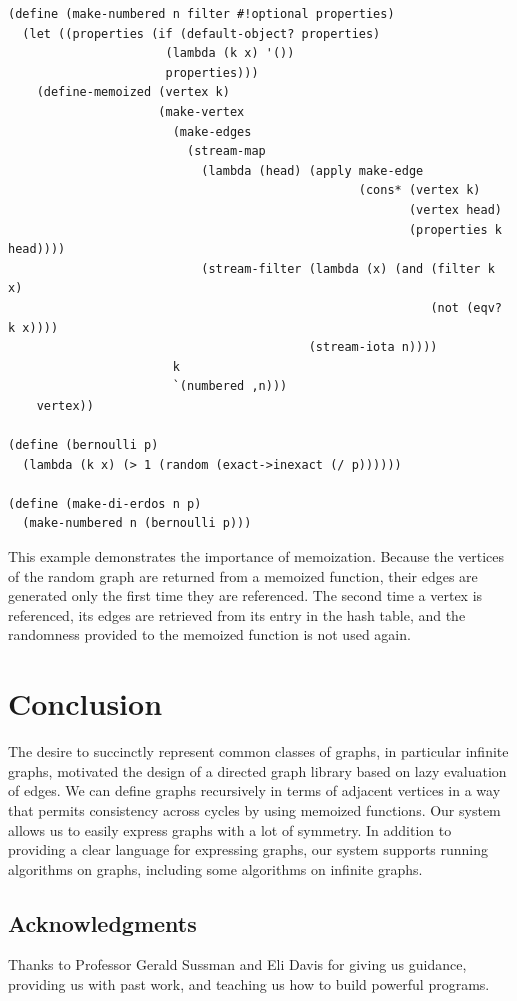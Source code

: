 \documentclass[11pt]{article} %
\theoremstyle{component}
\begin{document}
\begin{verbatim}
(define (make-numbered n filter #!optional properties)
  (let ((properties (if (default-object? properties)
                      (lambda (k x) '())
                      properties)))
    (define-memoized (vertex k)
                     (make-vertex
                       (make-edges
                         (stream-map
                           (lambda (head) (apply make-edge
                                                 (cons* (vertex k)
                                                        (vertex head)
                                                        (properties k head))))
                           (stream-filter (lambda (x) (and (filter k x)
                                                           (not (eqv? k x))))
                                          (stream-iota n))))
                       k
                       `(numbered ,n)))
    vertex))

(define (bernoulli p)
  (lambda (k x) (> 1 (random (exact->inexact (/ p))))))

(define (make-di-erdos n p)
  (make-numbered n (bernoulli p)))
\end{verbatim}

\noindent This example demonstrates the importance of memoization.  Because the vertices of the random graph are returned from a memoized function, their edges are generated only the first time they are referenced.  The second time a vertex is referenced, its edges are retrieved from its entry in the hash table, and the randomness provided to the memoized function is not used again.
\section{Conclusion}

The desire to succinctly represent common classes of graphs, in particular infinite graphs, motivated the design of a directed graph library based on lazy evaluation of edges. We can define graphs recursively in terms of adjacent vertices in a way that permits consistency across cycles by using memoized functions. Our system allows us to easily express graphs with a lot of symmetry.  In addition to providing a clear language for expressing graphs, our system supports running algorithms on graphs, including some algorithms on infinite graphs.

\subsection{Acknowledgments}

Thanks to Professor Gerald Sussman and Eli Davis for giving us guidance, providing us with past work, and teaching us how to build powerful programs.
\end{document}
